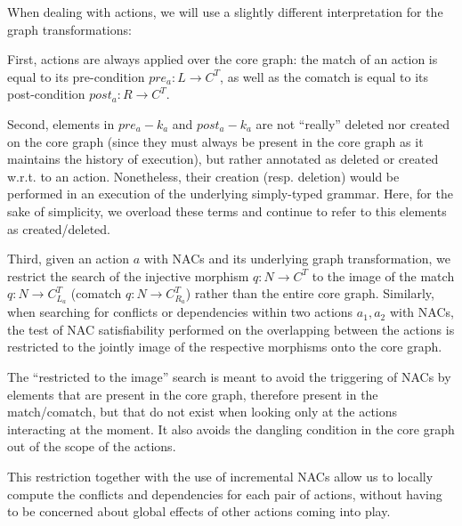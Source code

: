 \begin{remark} When dealing with actions, we will use a slightly different interpretation for the graph transformations:
  
First, actions are always applied over the core graph: the match of an action is equal to its pre-condition $pre_a : L \rightarrow C^T$, as well as the comatch is equal to its post-condition $post_a : R \rightarrow C^T$. 
  
  Second, elements in $pre_a - k_a$ and $post_a - k_a$ are not ``really'' deleted nor created on the core graph (since they must always be present in the core graph as it maintains the history of execution), but rather annotated as deleted or created w.r.t. to an action. Nonetheless, their creation (resp. deletion) would be performed in an execution of the underlying simply-typed grammar. Here, for the sake of simplicity, we overload these terms and continue to refer to this elements as created/deleted.

  Third, given an action $a$ with NACs and its underlying graph transformation, we restrict the search of the injective morphism $q : N \rightarrow C^T$ to the image of the match $q : N \rightarrow C^T_{L_a}$ (comatch $q : N \rightarrow C^T_{R_a}$) rather than the entire core graph. Similarly, when searching for conflicts or dependencies within two actions $a_1, a_2$ with NACs, the test of NAC satisfiability performed on the overlapping between the actions is restricted to the jointly image of the respective morphisms onto the core graph.

  The ``restricted to the image'' search is meant to avoid the triggering of NACs by elements that are present in the core graph, therefore present in the match/comatch, but that do not exist when looking only at the actions interacting at the moment. It also avoids the dangling condition in the core graph out of the scope of the actions. 
  
  This restriction together with the use of incremental NACs allow us to locally compute the conflicts and dependencies for each pair of actions, without having to be concerned about global effects of other actions coming into play.

\end{remark}


